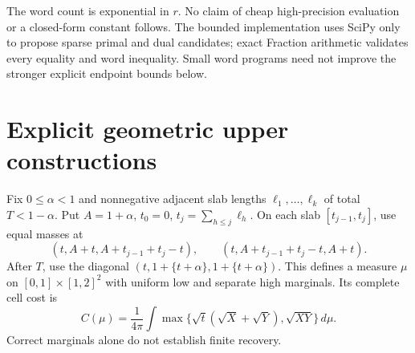 \documentclass[11pt]{article}
\theoremstyle{definition}\newtheorem{definition}[theorem]{Definition}
\theoremstyle{remark}\newtheorem{remark}[theorem]{Remark}
\begin{document}
The word count is exponential in $r$. No claim of cheap high-precision
evaluation or a closed-form constant follows. The bounded implementation
uses SciPy only to propose sparse primal and dual candidates; exact Fraction
arithmetic validates every equality and word inequality. Small word programs
need not improve the stronger explicit endpoint bounds below.

\section{Explicit geometric upper constructions}\label{sec:upper}

Fix $0\le\alpha<1$ and nonnegative adjacent slab lengths
$\ell_1,\ldots,\ell_k$ of total $T<1-\alpha$. Put $A=1+\alpha$,
$t_0=0$, $t_j=\sum_{h\le j}\ell_h$. On each slab
$[t_{j-1},t_j]$, use equal masses at
\[
 (t,A+t,A+t_{j-1}+t_j-t),\qquad
 (t,A+t_{j-1}+t_j-t,A+t).
\]
After $T$, use the diagonal $(t,1+\{t+\alpha\},1+\{t+\alpha\})$.
This defines a measure $\mu$ on $[0,1]\times[1,2]^2$ with uniform low
and separate high marginals. Its complete cell cost is
\begin{equation}\label{eq:blockcost}
 C(\mu)=\frac1{4\pi}\int
 \max\{\sqrt t(\sqrt X+\sqrt Y),\sqrt{XY}\}\,d\mu.
\end{equation}
Correct marginals alone do not establish finite recovery.
\end{document}
